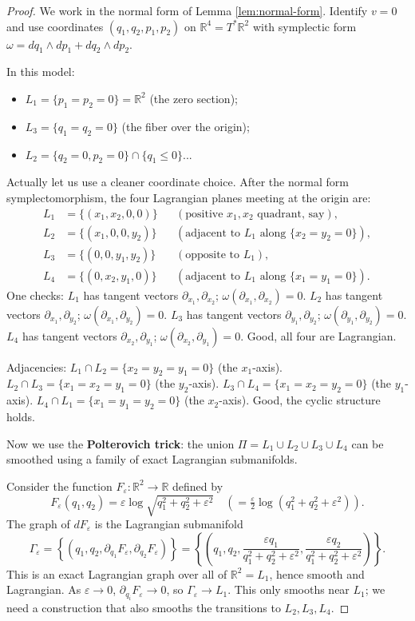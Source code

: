 \documentclass[12pt]{article}
\newcommand{\bR}{\mathbb{R}}
\newcommand{\eps}{\varepsilon}
\newcommand{\om}{\omega}
\begin{document}
\begin{proof}
We work in the normal form of Lemma \ref{lem:normal-form}. Identify $v = 0$ and use coordinates $(q_1, q_2, p_1, p_2)$ on $\bR^4 = T^*\bR^2$ with symplectic form $\om = dq_1 \wedge dp_1 + dq_2 \wedge dp_2$.

In this model:
\begin{itemize}
  \item $L_1 = \{p_1 = p_2 = 0\} = \bR^2$ (the zero section);
  \item $L_3 = \{q_1 = q_2 = 0\}$ (the fiber over the origin);
  \item $L_2 = \{q_2 = 0, p_2 = 0\} \cap \{q_1 \leq 0\}$...
\end{itemize}

Actually let us use a cleaner coordinate choice. After the normal form symplectomorphism, the four Lagrangian planes meeting at the origin are:
\begin{align*}
  L_1 &= \{(x_1, x_2, 0, 0)\} &&(\text{positive } x_1, x_2 \text{ quadrant, say}),\\
  L_2 &= \{(x_1, 0, 0, y_2)\} &&(\text{adjacent to }L_1\text{ along }\{x_2=y_2=0\}),\\
  L_3 &= \{(0, 0, y_1, y_2)\} &&(\text{opposite to }L_1),\\
  L_4 &= \{(0, x_2, y_1, 0)\} &&(\text{adjacent to }L_1\text{ along }\{x_1=y_1=0\}).
\end{align*}
One checks: $L_1$ has tangent vectors $\partial_{x_1}, \partial_{x_2}$; $\om(\partial_{x_1},\partial_{x_2}) = 0$. $L_2$ has tangent vectors $\partial_{x_1},\partial_{y_2}$; $\om(\partial_{x_1},\partial_{y_2}) = 0$. $L_3$ has tangent vectors $\partial_{y_1},\partial_{y_2}$; $\om(\partial_{y_1},\partial_{y_2}) = 0$. $L_4$ has tangent vectors $\partial_{x_2},\partial_{y_1}$; $\om(\partial_{x_2},\partial_{y_1}) = 0$. Good, all four are Lagrangian.

Adjacencies: $L_1 \cap L_2 = \{x_2=y_2=y_1=0\}$ (the $x_1$-axis). $L_2 \cap L_3 = \{x_1=x_2=y_1=0\}$ (the $y_2$-axis). $L_3 \cap L_4 = \{x_1=x_2=y_2=0\}$ (the $y_1$-axis). $L_4 \cap L_1 = \{x_1=y_1=y_2=0\}$ (the $x_2$-axis). Good, the cyclic structure holds.

Now we use the \textbf{Polterovich trick}: the union $\Pi = L_1 \cup L_2 \cup L_3 \cup L_4$ can be smoothed using a family of exact Lagrangian submanifolds.

Consider the function $F_\eps \colon \bR^2 \to \bR$ defined by
\[
  F_\eps(q_1, q_2) = \eps \log\!\sqrt{q_1^2 + q_2^2 + \eps^2}
  \quad (= \tfrac{\eps}{2}\log(q_1^2 + q_2^2 + \eps^2)).
\]
The graph of $dF_\eps$ is the Lagrangian submanifold
\[
  \Gamma_\eps = \left\{(q_1, q_2, \partial_{q_1}F_\eps, \partial_{q_2}F_\eps)\right\}
  = \left\{\left(q_1, q_2, \frac{\eps q_1}{q_1^2+q_2^2+\eps^2}, \frac{\eps q_2}{q_1^2+q_2^2+\eps^2}\right)\right\}.
\]
This is an exact Lagrangian graph over all of $\bR^2 = L_1$, hence smooth and Lagrangian. As $\eps \to 0$, $\partial_{q_i}F_\eps \to 0$, so $\Gamma_\eps \to L_1$. This only smooths near $L_1$; we need a construction that also smooths the transitions to $L_2, L_3, L_4$.


\end{proof}
\end{document}
